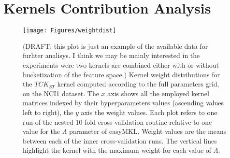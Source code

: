 \section{Kernels Contribution Analysis}

\begin{figure}[ht]
    \centering
    \texttt{[image: Figures/weightdist]}
    \caption{(DRAFT: this plot is just an example of the available data for furhter analisys.
        I think we may be mainly interested in the experiments were two kernels are combined
        either with or without bucketization of the feature space.)
        Kernel weight distributions for the $TCK_{ST}$ kernel
    computed according to the full parameters grid, on the NCI1 dataset.
    The $x$ axis shows all the employed kernel matrices indexed by their hyperparameters
    values (ascending values left to right), the $y$ axis the weight values.
    Each plot refers to one run of the nested 10-fold cross-validation routine relative to one
    value for the $\Lambda$ parameter of easyMKL. Weight values are the means between each of the inner
    cross-validation runs. The vertical lines highlight the kernel with the maximum weight for each value of $\Lambda$.}
        \label{fig:weightdist}
\end{figure}


